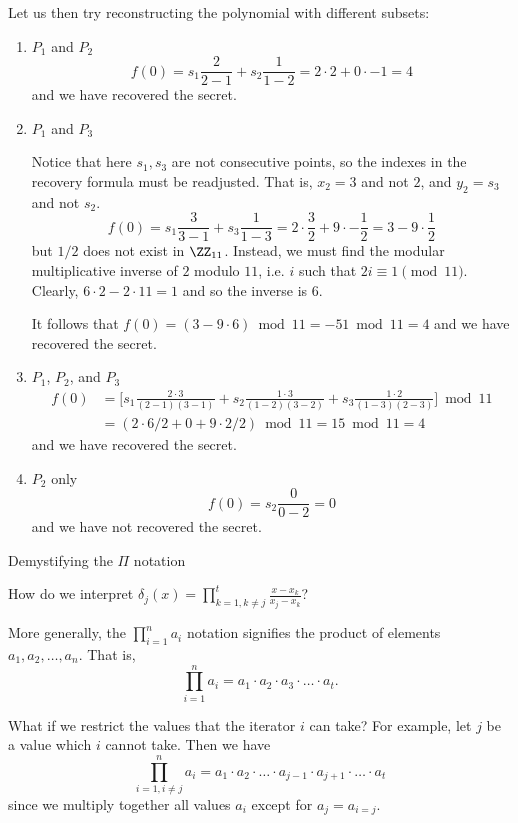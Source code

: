 \documentclass[parskip=half]{scrartcl}
\begin{document}
Let us then try reconstructing the polynomial with different subsets:
\begin{enumerate}
  \item $P_1$ and $P_2$
  \[
    f(0) = s_1 \frac{2}{2-1} + s_2 \frac{1}{1-2} =
    2 \cdot 2 + 0 \cdot -1 = 4
  \]
  and we have recovered the secret.

  \item $P_1$ and $P_3$
  
  Notice that here $s_1, s_3$ are not consecutive points, so the indexes in the recovery formula must be readjusted.
  That is, $x_2 = 3$ and not $2$, and $y_2 = s_3$ and not $s_2$.
  \[
    f(0) = s_1 \frac{3}{3-1} + s_3 \frac{1}{1-3} =
    2 \cdot \frac{3}{2} + 9 \cdot -\frac{1}{2} = 3 - 9 \cdot \frac{1}{2}
  \]
  but $1/2$ does not exist in $\ZZ_{11}$.
  Instead, we must find the modular multiplicative inverse of $2$ modulo $11$, i.e. $i$ such that $2i \equiv 1 \pmod{11}$.
  Clearly, $6 \cdot 2 - 2\cdot 11 = 1$ and so the inverse is $6$.

  It follows that
  $f(0) = (3 - 9\cdot 6) \bmod{11} = -51 \bmod{11} = 4$
  and we have recovered the secret.

  \item $P_1$, $P_2$, and $P_3$
  \begin{align*}
    f(0) &= \Biggl[s_1 \frac{2 \cdot 3}{(2-1)(3-1)} + s_2 \frac{1 \cdot 3}{(1-2)(3-2)} + s_3\frac{1 \cdot 2}{(1-3)(2-3)}\Biggr]\bmod{11}\\
    &= (2 \cdot 6/2 + 0 + 9 \cdot 2/2) \bmod{11} = 15 \bmod{11} = 4
  \end{align*}
  and we have recovered the secret.

  \item $P_2$ only
  \[
    f(0) = s_2 \frac{0}{0 - 2} = 0
  \]
  and we have not recovered the secret.
\end{enumerate}

\newpage

\begin{center}
  Demystifying the $\Pi$ notation
\end{center}

How do we interpret $\delta_j(x)=\prod_{k=1,k\neq j}^{t}\frac{x-x_k}{x_j-x_k}$?

More generally, the $\prod_{i = 1}^n a_i$ notation signifies the product of elements $a_1, a_2, \dots, a_n$.
That is,
\[
  \prod_{i = 1}^n a_i = a_1 \cdot a_2 \cdot a_3 \cdot \ldots \cdot a_t.
\]

What if we restrict the values that the iterator $i$ can take?
For example, let $j$ be a value which $i$ cannot take.
Then we have
\[
  \prod_{i = 1, i \neq j}^n a_i = a_1 \cdot a_2 \cdot \ldots \cdot a_{j-1} \cdot a_{j+1} \cdot \ldots \cdot a_t
\]
since we multiply together all values $a_i$ except for $a_j = a_{i = j}$.
\end{document}
